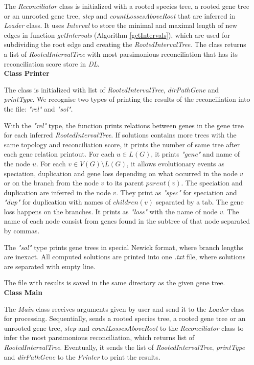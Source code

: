 The \emph{Reconciliator} class is initialized with a rooted species tree, a rooted gene tree or an unrooted gene tree, \emph{step} and \emph{countLossesAboveRoot} that are inferred in \emph{Loader} class. It uses \emph{Interval} to store the minimal and maximal length of new edges in function \emph{getIntervals} (Algorithm \ref{getIntervals}), which are used for subdividing the root edge and creating the \emph{RootedIntervalTree}. The class returns a list of \emph{RootedIntervalTree} with most parsimonious reconciliation that has its reconciliation score store in \emph{DL}.\\
\textbf{Class Printer}

The class is initialized with list of \emph{RootedIntervalTree}, \emph{dirPathGene} and \emph{printType}. We recognise two types of printing the results of the reconciliation into the file: \emph{"rel"} and \emph{"sol"}.

With the \emph{"rel"} type, the function prints relations between genes in the gene tree for each inferred \emph{RootedIntervalTree}. If solutions contains more trees with the same topology and reconciliation score, it prints the number of same tree after each gene relation printout. For each $u \in L(G)$, it prints \emph{"gene"} and name of the node $u$. For each $v \in V(G)\setminus L(G)$, it allows evolutionary events as speciation, duplication and gene loss depending on what occurred in the node $v$ or on the branch from the node $v$ to its parent $parent(v)$. The speciation and duplication are inferred in the node $v$. They print as \emph{"spec"} for speciation and \emph{"dup"} for duplication with names of $children(v)$ separated by a tab. The gene loss happens on the branches. It prints as \emph{"loss"} with the name of node $v$. The name of each node consist from genes found in the subtree of that node separated by commas. 

The \emph{"sol"} type prints gene trees in special Newick format, where branch lengths are inexact. All computed solutions are printed into one \emph{.txt} file, where solutions are separated with empty line.

The file with results is saved in the same directory as the given gene tree.\\
\textbf{Class Main}

The \emph{Main} class receives arguments given by user and send it to the \emph{Loader} class for processing. Sequentially, sends a rooted species tree, a rooted gene tree or an unrooted gene tree, \emph{step} and \emph{countLossesAboveRoot} to the \emph{Reconciliator} class to infer the most parsimonious reconciliation, which returns list of \emph{RootedIntervalTree}. Eventually, it sends the list of \emph{RootedIntervalTree}, \emph{printType} and \emph{dirPathGene} to the \emph{Printer} to print the results. \\
